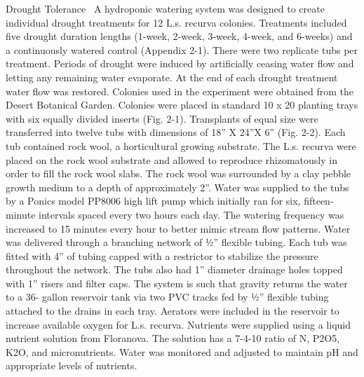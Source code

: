\documentclass[multicol]{elsarticle}
\begin{document}
\begin{multicols}{2}
\begin{subsection}{Drought Tolerance}
\,
A hydroponic watering system was designed to create individual drought treatments for 12 L.s. recurva colonies. Treatments included five drought duration lengths (1-week, 2-week, 3-week, 4-week, and 6-weeks) and a continuously watered control (Appendix 2-1). There were two replicate tubs per treatment. Periods of drought were induced by artificially ceasing water flow and letting any remaining water evaporate. At the end of each drought treatment water flow was restored. Colonies used in the experiment were obtained from the Desert Botanical Garden. Colonies were placed in standard 10 x 20 planting trays with six equally divided inserts (Fig. 2-1). Transplants of equal size were transferred into twelve tubs with dimensions of 18” X 24”X 6” (Fig. 2-2).  Each tub contained rock wool, a horticultural growing substrate. The L.s. recurva were placed on the rock wool substrate and allowed to reproduce rhizomatously in order to fill the rock wool slabs. The rock wool was surrounded by a clay pebble growth medium to a depth of approximately 2”. Water was supplied to the tubs by a Ponics model PP8006 high lift pump which initially ran for six, fifteen-minute intervals spaced every two hours each day. The watering frequency was increased to 15 minutes every hour to better mimic stream flow patterns. Water was delivered through a branching network of ½” flexible tubing. Each tub was fitted with 4” of tubing capped with a restrictor to stabilize the pressure throughout the network. The tubs also had 1” diameter drainage holes topped with 1” risers and filter caps. The system is such that gravity returns the water to a 36- gallon reservoir tank via two PVC tracks fed by ½” flexible tubing attached to the drains in each tray. Aerators were included in the reservoir to increase available oxygen for L.s. recurva. Nutrients were supplied using a liquid nutrient solution from Floranova. The solution has a 7-4-10 ratio of N, P2O5, K2O, and micronutrients. Water was monitored and adjusted to maintain pH and appropriate levels of nutrients. 
\end{subsection}


\end{multicols}
\end{document}
